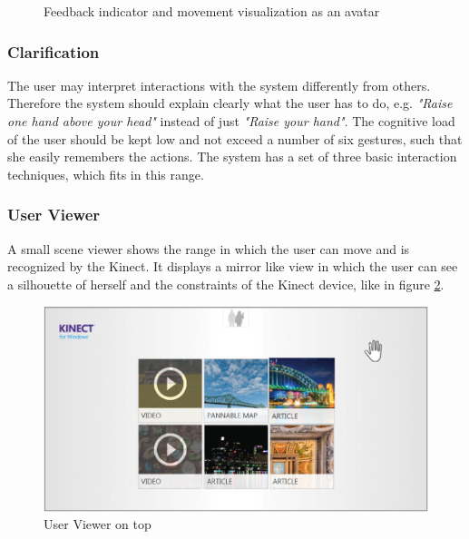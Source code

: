 \begin{figure}[htb]
\begin{minipage}[t]{0.49\linewidth}
		\label{fig:visualFeedbackAvatar}
	\end{minipage}
	\caption{Feedback indicator and movement visualization as an avatar~\cite{MicrosoftHIG2014-mh}}
	\label{fig:hciGuidelinesIndicatorAvatar}
\end{figure}

\subsubsection{Clarification}
The user may interpret interactions with the system differently from others. Therefore the system should explain clearly what the user has to do, e.g. \textit{"Raise one hand above your head"} instead of just \textit{"Raise your hand"}. The cognitive load of the user should be kept low and not exceed a number of six gestures, such that she easily remembers the actions. The system has a set of three basic interaction techniques, which fits in this range.

\subsubsection{User Viewer}
A small scene viewer shows the range in which the user can move and is recognized by the Kinect. It displays a mirror like view in which the user can see a silhouette of herself and the constraints of the Kinect device, like in figure \ref{fig:higUserViewer}.
\begin{figure}[htb]
	\centering
	\begin{minipage}[t]{1\linewidth}
		\centering
		\includegraphics[width=0.6\linewidth]{Pictures/higUserViewer}
		\caption{User Viewer on top~\cite{MicrosoftHIG2014-mh}}
		\label{fig:higUserViewer}
	\end{minipage}
\end{figure}

